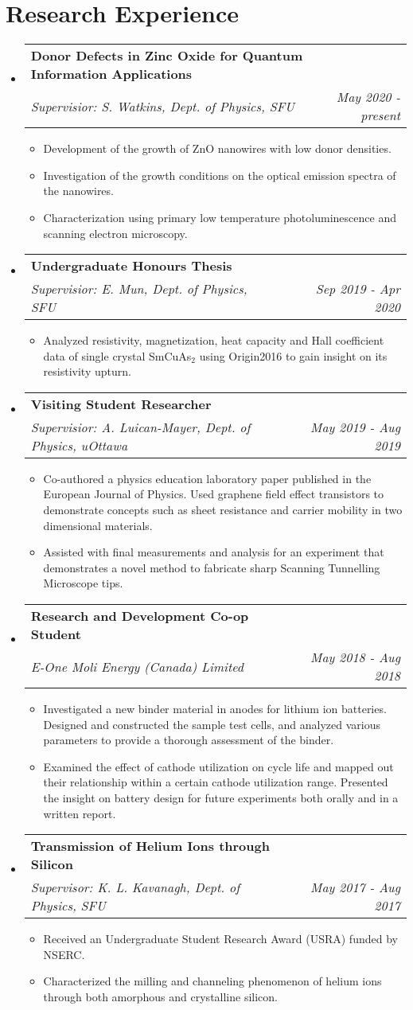 \documentclass[letterpaper, 11pt]{article}
\makeatletter
\newcommand{\resitem}[1]{\item #1 \vspace{-2pt}}
\newcommand{\ressubheading}[4]{
	\begin{tabular*}{6.5in}{l@{\extracolsep{\fill}}r}
		\textbf{#1} & #2 \\
		\textit{#3} & \textit{#4} \\
	\end{tabular*}\vspace{-6pt}}
\makeatother
\begin{document}
\section*{Research Experience}
\begin{itemize}
\item
\ressubheading{Donor Defects in Zinc Oxide for Quantum Information Applications}{}{Supervisior: S. Watkins, Dept. of Physics, SFU}{May 2020 - present}
\begin{itemize}
\resitem{Development of the growth of ZnO nanowires with low donor densities.}
\resitem{Investigation of the growth conditions on the optical emission spectra of the nanowires.}
\resitem{Characterization using primary low temperature photoluminescence and scanning electron microscopy.}
\end{itemize}
\item 
\ressubheading{Undergraduate Honours Thesis}{}{Supervisior: E. Mun, Dept. of Physics, SFU}{Sep 2019 - Apr 2020}
\begin{itemize}
\resitem{Analyzed resistivity, magnetization, heat capacity and Hall coefficient data of single crystal SmCuAs$_2$ using Origin2016 to gain insight on its resistivity upturn.}
\end{itemize}
\item 
\ressubheading{Visiting Student Researcher}{}{Supervisior: A. Luican-Mayer, Dept. of Physics, uOttawa}{May 2019 - Aug 2019}
\begin{itemize}
\resitem{Co-authored a physics education laboratory paper published in the European Journal of Physics. Used graphene field effect transistors to demonstrate concepts such as sheet resistance and carrier mobility in two dimensional materials.}
\resitem{Assisted with final measurements and analysis for an experiment that demonstrates a novel method to fabricate sharp Scanning Tunnelling Microscope tips.}
\end{itemize}
\item 
\ressubheading{Research and Development Co-op Student}{}{E-One Moli Energy (Canada) Limited}{May 2018 - Aug 2018}
\begin{itemize}
\resitem{Investigated a new binder material in anodes for lithium ion batteries. Designed and constructed the sample test cells, and analyzed various parameters to provide a thorough assessment of the binder.}
\resitem{Examined the effect of cathode utilization on cycle life and mapped out their relationship within a certain cathode utilization range. Presented the insight on battery design for future experiments both orally and in a written report.}
\end{itemize} 
\item
\ressubheading{Transmission of Helium Ions through Silicon}{}{Supervisor: K. L. Kavanagh, Dept. of Physics, SFU}{May 2017 - Aug 2017}
\begin{itemize}
\resitem{Received an Undergraduate Student Research Award (USRA) funded by NSERC.}
\resitem{Characterized the milling and channeling phenomenon of helium ions through both
amorphous and crystalline silicon.}

\end{itemize}

\end{itemize}
\end{document}
